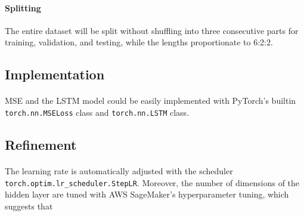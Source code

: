 \documentclass[12pt, letterpaper]{article}
\begin{document}
\paragraph{Splitting} The entire dataset will be split without shuffling into three consecutive parts for training, validation, and testing, while the lengths proportionate to 6:2:2.

\subsection{Implementation}

\paragraph{}
MSE and the LSTM model could be easily implemented with PyTorch's builtin \texttt{torch.nn.MSELoss} class and \texttt{torch.nn.LSTM} class.

\subsection{Refinement}

\paragraph{}
The learning rate is automatically adjusted with the scheduler \\\texttt{torch.optim.lr\_scheduler.StepLR}. Moreover, the number of dimensions of the hidden layer are tuned with AWS SageMaker's hyperparameter tuning, which suggests that
\end{document}
